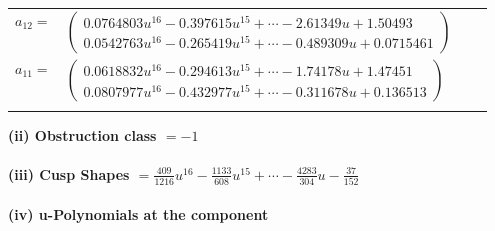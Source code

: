 \documentclass[1p]{elsarticle_modified}
\theoremstyle{definition}
\begin{document}
\begin{tabular}{m{7pt} m{180pt} m{7pt} m{180pt} }
\flushright $a_{12}=$&$\begin{pmatrix}0.0764803 u^{16}-0.397615 u^{15}+\cdots-2.61349 u+1.50493\\0.0542763 u^{16}-0.265419 u^{15}+\cdots-0.489309 u+0.0715461\end{pmatrix}$ \\
\flushright $a_{11}=$&$\begin{pmatrix}0.0618832 u^{16}-0.294613 u^{15}+\cdots-1.74178 u+1.47451\\0.0807977 u^{16}-0.432977 u^{15}+\cdots-0.311678 u+0.136513\end{pmatrix}$\\&\end{tabular}
\flushleft \textbf{(ii) Obstruction class $= -1$}\\~\\
\flushleft \textbf{(iii) Cusp Shapes $= \frac{409}{1216} u^{16}-\frac{1133}{608} u^{15}+\cdots-\frac{4283}{304} u-\frac{37}{152}$}\\~\\
\newpage\renewcommand{\arraystretch}{1}
\flushleft \textbf{(iv) u-Polynomials at the component}\newline \\
\end{document}
